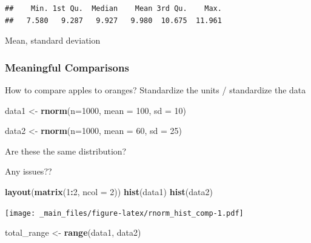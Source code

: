 \documentclass[
]{book}
\newenvironment{Shaded}{\begin{snugshade}}{\end{snugshade}}
\newcommand{\DataTypeTok}[1]{\textcolor[rgb]{0.13,0.29,0.53}{#1}}
\newcommand{\DecValTok}[1]{\textcolor[rgb]{0.00,0.00,0.81}{#1}}
\newcommand{\KeywordTok}[1]{\textcolor[rgb]{0.13,0.29,0.53}{\textbf{#1}}}
\newcommand{\NormalTok}[1]{#1}
\newcommand{\OperatorTok}[1]{\textcolor[rgb]{0.81,0.36,0.00}{\textbf{#1}}}
\newcommand{\StringTok}[1]{\textcolor[rgb]{0.31,0.60,0.02}{#1}}
\begin{document}
\begin{verbatim}
##    Min. 1st Qu.  Median    Mean 3rd Qu.    Max. 
##   7.580   9.287   9.927   9.980  10.675  11.961
\end{verbatim}

Mean, standard deviation

\hypertarget{meaningful-comparisons}{%
\subsubsection{Meaningful Comparisons}\label{meaningful-comparisons}}

How to compare apples to oranges? Standardize the units / standardize the data

\begin{Shaded}
\begin{Highlighting}[]
\NormalTok{data1 <-}\StringTok{ }\KeywordTok{rnorm}\NormalTok{(}\DataTypeTok{n=}\DecValTok{1000}\NormalTok{, }
              \DataTypeTok{mean =} \DecValTok{100}\NormalTok{,}
              \DataTypeTok{sd =} \DecValTok{10}\NormalTok{)}

\NormalTok{data2 <-}\StringTok{ }\KeywordTok{rnorm}\NormalTok{(}\DataTypeTok{n=}\DecValTok{1000}\NormalTok{,}
               \DataTypeTok{mean =} \DecValTok{60}\NormalTok{, }
               \DataTypeTok{sd =} \DecValTok{25}\NormalTok{)}
\end{Highlighting}
\end{Shaded}

Are these the same distribution?

Any issues??

\begin{Shaded}
\begin{Highlighting}[]
\KeywordTok{layout}\NormalTok{(}\KeywordTok{matrix}\NormalTok{(}\DecValTok{1}\OperatorTok{:}\DecValTok{2}\NormalTok{, }\DataTypeTok{ncol =} \DecValTok{2}\NormalTok{))}
\KeywordTok{hist}\NormalTok{(data1)}
\KeywordTok{hist}\NormalTok{(data2)}
\end{Highlighting}
\end{Shaded}

\texttt{[image: \_main\_files/figure-latex/rnorm\_hist\_comp-1.pdf]}

\begin{Shaded}
\begin{Highlighting}[]
\NormalTok{total_range <-}\StringTok{ }\KeywordTok{range}\NormalTok{(data1, data2)}
\end{Highlighting}
\end{Shaded}
\end{document}
